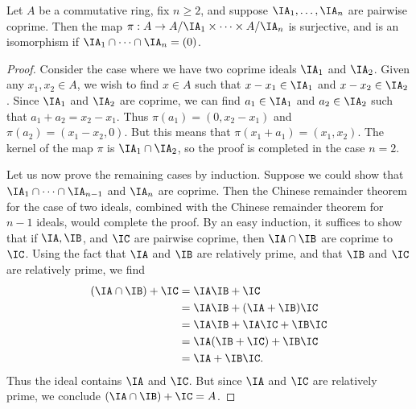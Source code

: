 \begin{theorem}
    Let $A$ be a commutative ring, fix $n \geq 2$, and suppose $\IA_1, \dots, \IA_n$ are pairwise coprime. Then the map $\pi: A \to A/\IA_1 \times \dots \times A/\IA_n$ is surjective, and is an isomorphism if $\IA_1 \cap \dots \cap \IA_n = (0)$.
\end{theorem}
\begin{proof}
    Consider the case where we have two coprime ideals $\IA_1$ and $\IA_2$. Given any $x_1,x_2 \in A$, we wish to find $x \in A$ such that $x - x_1 \in \IA_1$ and $x - x_2 \in \IA_2$. Since $\IA_1$ and $\IA_2$ are coprime, we can find $a_1 \in \IA_1$ and $a_2 \in \IA_2$ such that $a_1 + a_2 = x_2 - x_1$. Thus $\pi(a_1) = (0,x_2-x_1)$ and $\pi(a_2) = (x_1-x_2,0)$. But this means that $\pi(x_1 + a_1) = (x_1,x_2)$. The kernel of the map $\pi$ is $\IA_1 \cap \IA_2$, so the proof is completed in the case $n = 2$.

    Let us now prove the remaining cases by induction. Suppose we could show that $\IA_1 \cap \dots \cap \IA_{n-1}$ and $\IA_n$ are coprime. Then the Chinese remainder theorem for the case of two ideals, combined with the Chinese remainder theorem for $n - 1$ ideals, would complete the proof. By an easy induction, it suffices to show that if $\IA, \IB$, and $\IC$ are pairwise coprime, then $\IA \cap \IB$ are coprime to $\IC$. Using the fact that $\IA$ and $\IB$ are relatively prime, and that $\IB$ and $\IC$ are relatively prime, we find
    \begin{align*}
        (\IA \cap \IB) + \IC &= \IA \IB + \IC\\
        &= \IA \IB + (\IA + \IB) \IC\\
        &= \IA \IB + \IA \IC + \IB \IC\\
        &= \IA (\IB + \IC) + \IB \IC\\
        &= \IA + \IB \IC.
    \end{align*}
    Thus the ideal contains $\IA$ and $\IC$. But since $\IA$ and $\IC$ are relatively prime, we conclude $(\IA \cap \IB) + \IC = A$.
\end{proof}

